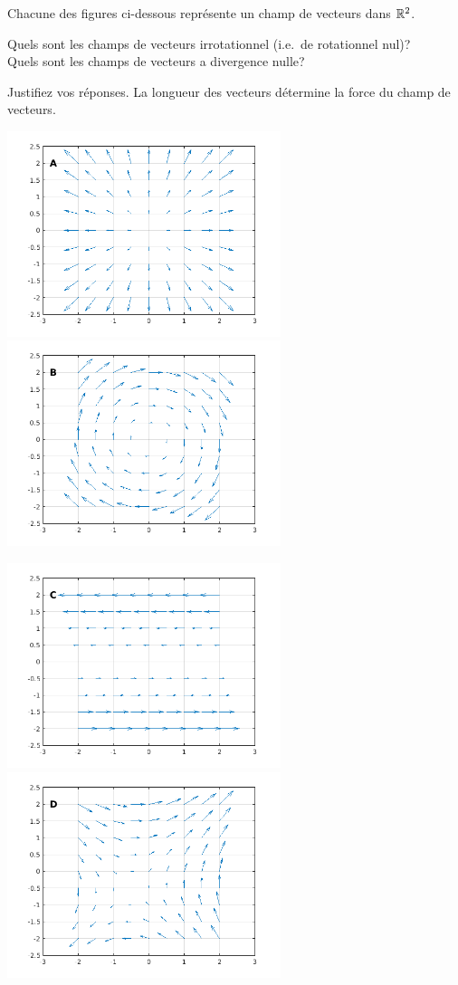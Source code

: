 \begin{question}
Chacune des figures ci-dessous représente un champ de vecteurs dans
$\mathbb{R}^2$.

 Quels sont les champs de vecteurs irrotationnel (i.e.\ de
rotationnel nul)?\\ 
 Quels sont les champs de vecteurs a divergence nulle?

Justifiez vos réponses.  La longueur des vecteurs détermine la force
du champ de vecteurs.

\includegraphics[width=8cm]{17_vector_calculus/vect_field1}
\includegraphics[width=8cm]{17_vector_calculus/vect_field2}

\includegraphics[width=8cm]{17_vector_calculus/vect_field3}
\includegraphics[width=8cm]{17_vector_calculus/vect_field4}
\label{17Q8}
\end{question}

